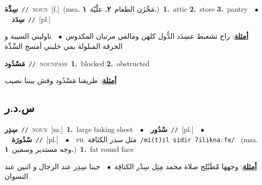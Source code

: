 \documentclass[10pt,a4paper,twoside]{article} %
\begin{document}
\begin{multicols}{2}
{\setlength\topsep{0pt}\textbf{\foreignlanguage{arabic}{سِدِّة}}\ {\color{gray}\texttt{//}\color{black}}\ \textsc{noun}\ [f.]\ \color{gray}(msa. \foreignlanguage{arabic}{مَخْزَن الطعام}~\foreignlanguage{arabic}{\textbf{٢.}}  \foreignlanguage{arabic}{علّيّة}~\foreignlanguage{arabic}{\textbf{١.}})\color{black}\ \textbf{1.}~attic  \textbf{2.}~store  \textbf{3.}~pantry\ \ $\bullet$\ \ \setlength\topsep{0pt}\textbf{\foreignlanguage{arabic}{سِدَد}}\ {\color{gray}\texttt{//}\color{black}}\ [pl.]\  \begin{flushright}\color{gray}\foreignlanguage{arabic}{\textbf{\underline{\foreignlanguage{arabic}{أمثلة}}}: راح تشعبط عسِدَد الدُّول كلهن ومالقي مرتبان المكدوس\ $\bullet$\ \  ناوليني السيبة و الخرقة المبلولة بمي خليني أمسح السِّدِّة}\end{flushright}\color{black}} \vspace{2mm}

{\setlength\topsep{0pt}\textbf{\foreignlanguage{arabic}{مَسْدُود}}\ {\color{gray}\texttt{//}\color{black}}\ \textsc{noun\textunderscore pass}\ \textbf{1.}~blocked  \textbf{2.}~obstructed\  \begin{flushright}\color{gray}\foreignlanguage{arabic}{\textbf{\underline{\foreignlanguage{arabic}{أمثلة}}}: طريقنا مَسْدُود وفش بيننا نصيب}\end{flushright}\color{black}} \vspace{2mm}

\vspace{-3mm}
\subsection*{\color{blue}\foreignlanguage{arabic}{س.د.ر}\color{blue}{}} 

{\setlength\topsep{0pt}\textbf{\foreignlanguage{arabic}{سِدِر}}\ {\color{gray}\texttt{//}\color{black}}\ \textsc{noun}\ [m.]\ \textbf{1.}~large baking sheet\ \ $\bullet$\ \ \setlength\topsep{0pt}\textbf{\foreignlanguage{arabic}{سْدُور}}\ {\color{gray}\texttt{//}\color{black}}\ [pl.]\ \ $\bullet$\ \ \setlength\topsep{0pt}\textbf{\foreignlanguage{arabic}{سْدُورَة}}\ {\color{gray}\texttt{//}\color{black}}\ [pl.]\ \ $\bullet$\ \ \textsc{ph.} \color{gray} \foreignlanguage{arabic}{مثل سدر الكنَافة}\color{black}\ {\color{gray}\texttt{/{\sffamily mi(t)il sidir ʔiliknaːfe}/}\color{black}}\ \color{gray} (msa. \foreignlanguage{arabic}{وجه مستدير وسمين}~\foreignlanguage{arabic}{\textbf{١.}})\color{black}\ \textbf{1.}~fat round face\  \begin{flushright}\color{gray}\foreignlanguage{arabic}{\textbf{\underline{\foreignlanguage{arabic}{أمثلة}}}: وجهها مْطَبْلِج صلاة محمد مِثِل سِدْر الكنافِة\ $\bullet$\ \  جبنا سِدِر عند الرجال و اثنين عند النسوان}\end{flushright}\color{black}} \vspace{2mm}


\end{multicols}
\end{document}
